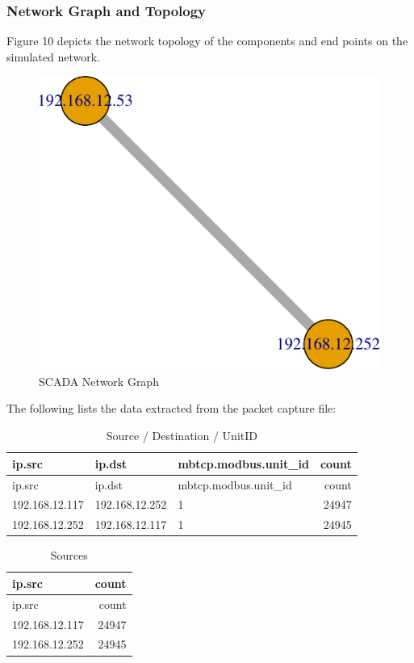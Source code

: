 \documentclass[11pt,]{article}
\begin{document}
\subsubsection{Network Graph and
Topology}\label{network-graph-and-topology}

Figure 10 depicts the network topology of the components and end points
on the simulated network.

\begin{figure}

{\centering \includegraphics{thesis_files/figure-latex/warning-1} 

}

\caption{SCADA Network Graph}\label{fig:warning}
\end{figure}

The following lists the data extracted from the packet capture file:

\begin{longtable}[c]{@{}lllr@{}}
\caption{Source / Destination / UnitID}\tabularnewline
\toprule
ip.src & ip.dst & mbtcp.modbus.unit\_id & count\tabularnewline
\midrule
\endfirsthead
\toprule
ip.src & ip.dst & mbtcp.modbus.unit\_id & count\tabularnewline
\midrule
\endhead
192.168.12.117 & 192.168.12.252 & 1 & 24947\tabularnewline
192.168.12.252 & 192.168.12.117 & 1 & 24945\tabularnewline
\bottomrule
\end{longtable}

\begin{longtable}[c]{@{}lr@{}}
\caption{Sources}\tabularnewline
\toprule
ip.src & count\tabularnewline
\midrule
\endfirsthead
\toprule
ip.src & count\tabularnewline
\midrule
\endhead
192.168.12.117 & 24947\tabularnewline
192.168.12.252 & 24945\tabularnewline
\bottomrule
\end{longtable}
\end{document}
